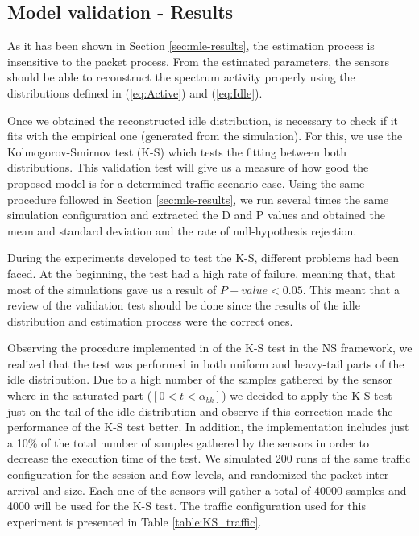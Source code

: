 \subsection{Model validation - Results} \label{sec:ks-results}
As it has been shown in Section \ref{sec:mle-results}, the estimation process is insensitive to the packet process. From the estimated parameters, the sensors should be able to reconstruct the spectrum activity properly using the distributions defined in (\ref{eq:Active}) and (\ref{eq:Idle}).

Once we obtained the reconstructed idle distribution, is necessary to check if it fits with the empirical one (generated from the simulation). For this, we use the Kolmogorov-Smirnov test (\acs{K-S}) which tests the fitting between both distributions. This validation test will give us a measure of how good the proposed model is for a determined traffic scenario case. Using the same procedure followed in Section \ref{sec:mle-results}, we run several times the same simulation configuration and extracted the D and P values and obtained the mean and standard deviation and the rate of null-hypothesis rejection.

During the experiments developed to test the \acs{K-S}, different problems had been faced. At the beginning, the test had a high rate of failure, meaning that, that most of the simulations gave us a result of ${P-value<0.05}$. This meant that a review of the validation test should be done since the results of the idle distribution and estimation process were the correct ones.

Observing the procedure implemented in \cite{marcello} of the \acs{K-S} test in the NS framework, we realized that the test was performed in both uniform and heavy-tail parts of the idle distribution. Due to a high number of the samples gathered by the sensor where in the saturated part ($[0 < t < \alpha_{bk}]$) we decided to apply the \acs{K-S} test just on the tail of the idle distribution and observe if this correction made the performance of the \acs{K-S} test better. In addition, the implementation includes just a 10\% of the total number of samples gathered by the sensors in order to decrease the execution time of the test. We simulated 200 runs of the same traffic configuration for the session and flow levels, and randomized the packet inter-arrival and size. Each one of the sensors will gather a total of 40000 samples and 4000 will be used for the \acs{K-S} test. The traffic configuration used for this experiment is presented in Table \ref{table:KS_traffic}.

